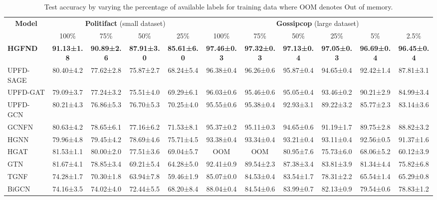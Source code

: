 \documentclass[conference]{IEEEtran}
\begin{document}
\begin{table*}[!htbp]
\centering
\caption{Test accuracy by varying the percentage of available labels for training data where OOM denotes Out of memory.}\label{result_downsample}

\begin{tabular}{lcccccccccc}
\hline
\multicolumn{1}{c}{\multirow{2}{*}{\textbf{Model}}}    & \multicolumn{4}{c}{\textbf{Politifact} (small dataset)}          & \multicolumn{6}{c}{\textbf{Gossipcop} (large dataset)}
              \\ \cmidrule(l){2-5} \cmidrule(l){6-11}
              & 100\% & 75\%        & 50\%        & 25\%        & 100\% & 75\% & 50\%        & 25\%        & 5\%& 2.5\%        \\
\hline
\hline

\textbf{HGFND}     &   \textbf{91.13±1.8}  & \textbf{90.89±2.6} & \textbf{87.91±3.0} & \textbf{85.61±6.0} &  \textbf{97.46±0.3}  & \textbf{97.32±0.3} & \textbf{97.13±0.4} & \textbf{97.05±0.3} & \textbf{96.69±0.4}& \textbf{96.45±0.4} \\
UPFD-SAGE     &  80.40±4.2   &    77.62±2.8       &      75.87±2.7      &     68.24±5.4      &  96.38±0.4 & 96.26±0.6  &     95.87±0.4      &       94.65±0.4    &   92.42±1.4  & 87.81±3.1     \\
UPFD-GAT      &   79.09±3.7  &    77.24±3.2       &     75.51±4.0      &     69.29±6.1      &  96.03±0.6  & 95.46±0.6 &     95.05±0.4      &     93.46±0.2      &    90.21±2.9  & 84.99±3.4    \\
UPFD-GCN      &  80.21±4.3   &     76.86±5.3      &     76.70±5.3      &     70.25±4.0      &   95.55±0.6& 95.38±0.4  &     92.93±3.1      &     89.22±3.2      &    85.77±2.3  & 83.14±3.6    \\
GCNFN         &  80.63±4.2   &     78.65±6.1      &     77.16±6.2      &     71.53±8.1      &   95.37±0.2 & 95.11±0.3 &      94.65±0.6      &      91.19±1.7     &    89.75±2.8 & 88.82±3.2      \\

HGNN          &  79.96±4.8   &     79.45±4.2     &      78.69±4.6      &    75.71±4.5        &  93.38±0.4 & 93.34±0.4 &     93.21±0.4      &      93.11±0.4     &     92.56±0.5 & 91.37±1.6    \\
HGAT          &  81.53±1.1   &     80.00±2.0      &     77.51±3.6      &     69.04±5.7      &   OOM & OOM &     80.95±7.6      &     75.73±6.0      &     68.06±5.2    &60.12±3.9 \\
GTN           &   81.67±4.1  &     78.85±3.4      &     69.21±5.4      &     64.28±5.0      &  92.41±0.9& 89.54±2.3   &      87.38±3.4     &     83.81±3.9      &     81.34±4.4   & 75.82±6.8  \\
    TGNF          &  74.28±1.7   &     70.30±1.8      &      63.94±7.8     &      59.46±1.9     &  85.07±0.0& 84.53±0.4   &      83.54±1.7     &     78.31±2.2      &    65.54±1.4   & 65.29±0.8   \\
BiGCN         &   74.16±3.5  &     74.02±4.0      &     72.44±5.5      &      68.20±8.4     &  88.04±0.4& 84.54±0.6   &      83.99±0.7     &     82.13±0.9      &    79.54±0.6   & 78.83±1.2   \\



\end{tabular}
\end{table*}
\end{document}
